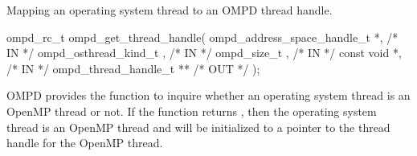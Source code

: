 %
%
%
%
%
%
%


\summary
Mapping an operating system thread to an OMPD thread handle.
\format
\cspecificstart
\begin{boxedcode}
ompd\_rc\_t ompd\_get\_thread\_handle(
  ompd\_address\_space\_handle\_t   *,                            /* IN */
  ompd\_osthread\_kind\_t           ,                              /* IN */
  ompd\_size\_t                    ,                   /* IN */
  const void                    *,                          /* IN */
  ompd\_thread\_handle\_t         **                     /* OUT */
);
\end{boxedcode}
\cspecificend

\descr
OMPD provides the function 
to inquire whether an operating system thread is an OpenMP
thread or not.
If the function returns , then the operating
system thread is an OpenMP thread and 
will be initialized to a pointer to the thread handle for
the OpenMP thread.

